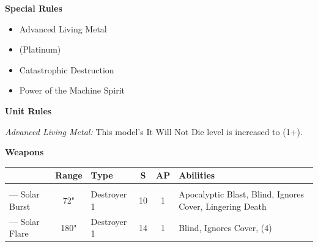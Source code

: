 \begin{minipage}[t]{0.72\textwidth}
\begin{minipage}[t]{0.5\textwidth}
\begin{flushleft}
			\textbf{Special Rules}
			\begin{itemize}
				\item Advanced Living Metal
				\item {} (Platinum)
				\item Catastrophic Destruction
				\item Power of the Machine Spirit
			\end{itemize}
		\end{flushleft}
	\end{minipage}
	
	\vspace*{2em}
	\textbf{Unit Rules}
	
	\textit{Advanced Living Metal:} This model's It Will Not Die level is increased to (1+).
	
	\vspace*{2em}
	\textbf{Weapons}
	
	\begin{tabular}{L{90 pt} c C{40pt} *{2}{c} >{\raggedright\arraybackslash}p{130pt}}
		& Range & Type & S & AP & Abilities \\
		\hline
		 & & & & & \\
		— Solar Burst & 72" & Destroyer 1 & 10 & 1 & Apocalyptic Blast, Blind, Ignores Cover, Lingering Death \\
		— Solar Flare & 180" & Destroyer 1 & 14 & 1 & Blind, Ignores Cover,  (4)\\
	\end{tabular}
\end{minipage}



\newpage
\subsubsection[Doomsday Monolith]{}


\newpage
\subsubsection[Gauss Pylon]{}

\newpage
\subsubsection[Night Shroud Bomber]{}


\newpage
\subsubsection[Sentry Pylon]{}



